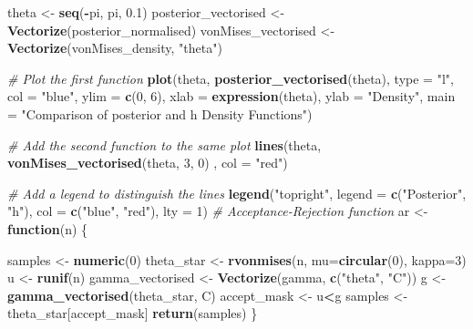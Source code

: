 \documentclass[12pt,halfline,a4paper,]{ouparticle}
\newenvironment{Shaded}{\begin{snugshade}}{\end{snugshade}}
\newcommand{\AttributeTok}[1]{\textcolor[rgb]{0.13,0.29,0.53}{#1}}
\newcommand{\CommentTok}[1]{\textcolor[rgb]{0.56,0.35,0.01}{\textit{#1}}}
\newcommand{\ControlFlowTok}[1]{\textcolor[rgb]{0.13,0.29,0.53}{\textbf{#1}}}
\newcommand{\DecValTok}[1]{\textcolor[rgb]{0.00,0.00,0.81}{#1}}
\newcommand{\FloatTok}[1]{\textcolor[rgb]{0.00,0.00,0.81}{#1}}
\newcommand{\FunctionTok}[1]{\textcolor[rgb]{0.13,0.29,0.53}{\textbf{#1}}}
\newcommand{\NormalTok}[1]{#1}
\newcommand{\OtherTok}[1]{\textcolor[rgb]{0.56,0.35,0.01}{#1}}
\newcommand{\SpecialCharTok}[1]{\textcolor[rgb]{0.81,0.36,0.00}{\textbf{#1}}}
\newcommand{\StringTok}[1]{\textcolor[rgb]{0.31,0.60,0.02}{#1}}
\begin{document}
\begin{Shaded}
\begin{Highlighting}[]
\NormalTok{theta }\OtherTok{\textless{}{-}} \FunctionTok{seq}\NormalTok{(}\SpecialCharTok{{-}}\NormalTok{pi, pi, }\FloatTok{0.1}\NormalTok{)}
\NormalTok{posterior\_vectorised }\OtherTok{\textless{}{-}} \FunctionTok{Vectorize}\NormalTok{(posterior\_normalised)}
\NormalTok{vonMises\_vectorised }\OtherTok{\textless{}{-}} \FunctionTok{Vectorize}\NormalTok{(vonMises\_density, }\StringTok{"theta"}\NormalTok{)}

\CommentTok{\# Plot the first function}
\FunctionTok{plot}\NormalTok{(theta, }\FunctionTok{posterior\_vectorised}\NormalTok{(theta),}
     \AttributeTok{type =} \StringTok{"l"}\NormalTok{,}
     \AttributeTok{col =} \StringTok{"blue"}\NormalTok{,}
     \AttributeTok{ylim =} \FunctionTok{c}\NormalTok{(}\DecValTok{0}\NormalTok{, }\DecValTok{6}\NormalTok{),}
     \AttributeTok{xlab =} \FunctionTok{expression}\NormalTok{(theta),}
     \AttributeTok{ylab =} \StringTok{"Density"}\NormalTok{,}
     \AttributeTok{main =} \StringTok{"Comparison of posterior and h Density Functions"}\NormalTok{)}

\CommentTok{\# Add the second function to the same plot}
\FunctionTok{lines}\NormalTok{(theta, }\FunctionTok{vonMises\_vectorised}\NormalTok{(theta, }\DecValTok{3}\NormalTok{, }\DecValTok{0}\NormalTok{) , }\AttributeTok{col =} \StringTok{"red"}\NormalTok{)}

\CommentTok{\# Add a legend to distinguish the lines}
\FunctionTok{legend}\NormalTok{(}\StringTok{"topright"}\NormalTok{,}
       \AttributeTok{legend =} \FunctionTok{c}\NormalTok{(}\StringTok{"Posterior"}\NormalTok{, }\StringTok{"h"}\NormalTok{),}
       \AttributeTok{col =} \FunctionTok{c}\NormalTok{(}\StringTok{"blue"}\NormalTok{, }\StringTok{"red"}\NormalTok{),}
       \AttributeTok{lty =} \DecValTok{1}\NormalTok{)}
\CommentTok{\# Acceptance{-}Rejection function}
\NormalTok{ar }\OtherTok{\textless{}{-}} \ControlFlowTok{function}\NormalTok{(n) \{}
  
\NormalTok{  samples }\OtherTok{\textless{}{-}} \FunctionTok{numeric}\NormalTok{(}\DecValTok{0}\NormalTok{)}
\NormalTok{  theta\_star }\OtherTok{\textless{}{-}} \FunctionTok{rvonmises}\NormalTok{(n, }\AttributeTok{mu=}\FunctionTok{circular}\NormalTok{(}\DecValTok{0}\NormalTok{), }\AttributeTok{kappa=}\DecValTok{3}\NormalTok{)}
\NormalTok{  u }\OtherTok{\textless{}{-}} \FunctionTok{runif}\NormalTok{(n)}
\NormalTok{  gamma\_vectorised }\OtherTok{\textless{}{-}} \FunctionTok{Vectorize}\NormalTok{(gamma, }\FunctionTok{c}\NormalTok{(}\StringTok{"theta"}\NormalTok{, }\StringTok{"C"}\NormalTok{))}
\NormalTok{  g }\OtherTok{\textless{}{-}} \FunctionTok{gamma\_vectorised}\NormalTok{(theta\_star, C)}
\NormalTok{  accept\_mask }\OtherTok{\textless{}{-}}\NormalTok{ u}\SpecialCharTok{\textless{}}\NormalTok{g}
\NormalTok{  samples }\OtherTok{\textless{}{-}}\NormalTok{ theta\_star[accept\_mask]}
  \FunctionTok{return}\NormalTok{(samples)}
\NormalTok{\}}


\end{Highlighting}
\end{Shaded}
\end{document}
